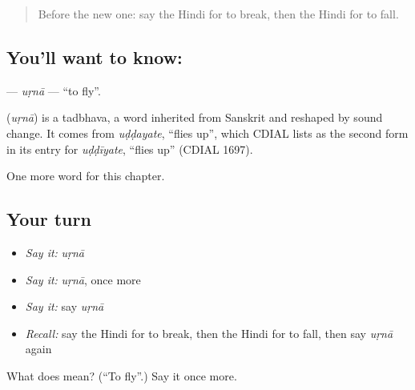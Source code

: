 \begin{quote}
Before the new one: say the Hindi for to break, then the Hindi for to fall.
\end{quote}

\subsection*{You'll want to know: }
\textbf{} — \emph{uṛnā} — \textquotedblleft{}to fly\textquotedblright{}.

\begin{cousinweb}
\textbf{} (\emph{uṛnā}) is a tadbhava, a word inherited from Sanskrit and reshaped by sound change. It comes from \emph{uḍḍayate}, \textquotedblleft{}flies up\textquotedblright{}, which CDIAL lists as the second form in its entry for \emph{uḍḍīyate}, \textquotedblleft{}flies up\textquotedblright{} (CDIAL 1697).
\end{cousinweb}

\begin{grammarlens}[title={What you've built}]
One more word for this chapter.
\end{grammarlens}

\subsection*{Your turn}
\begin{itemize}
\raggedright
  \item \emph{Say it:} \emph{uṛnā}
  \item \emph{Say it:} \emph{uṛnā}, once more
  \item \emph{Say it:} say \emph{uṛnā}
  \item \emph{Recall:} say the Hindi for to break, then the Hindi for to fall, then say \emph{uṛnā} again
\end{itemize}

\begin{tcolorbox}[breakable,colback=teal!4,colframe=teal!35!black,title={Before you move on}]
What does  mean? (\textquotedblleft{}To fly\textquotedblright{}.) Say it once more.
\end{tcolorbox}
